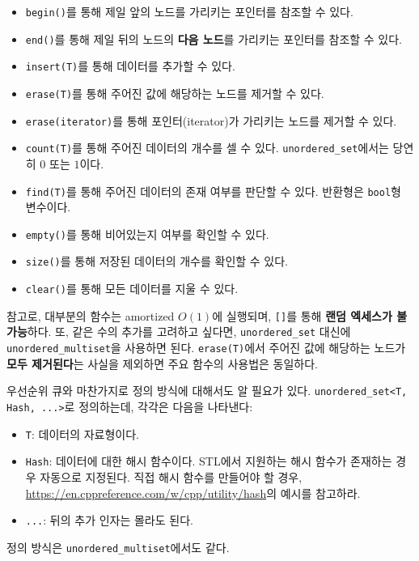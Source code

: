 \begin{itemize}
    \item \texttt{begin()}를 통해 제일 앞의 노드를 가리키는 포인터를 참조할 수 있다.
    \item \texttt{end()}를 통해 제일 뒤의 노드의 \textbf{다음 노드}를 가리키는 포인터를 참조할 수 있다.
    \item \texttt{insert(T)}를 통해 데이터를 추가할 수 있다.
    \item \texttt{erase(T)}를 통해 주어진 값에 해당하는 노드를 제거할 수 있다.
    \item \texttt{erase(iterator)}를 통해 포인터(iterator)가 가리키는 노드를 제거할 수 있다.
    \item \texttt{count(T)}를 통해 주어진 데이터의 개수를 셀 수 있다. \texttt{unordered\_set}에서는 당연히 $0$ 또는 $1$이다.
    \item \texttt{find(T)}를 통해 주어진 데이터의 존재 여부를 판단할 수 있다. 반환형은 \texttt{bool}형 변수이다.
    \item \texttt{empty()}를 통해 비어있는지 여부를 확인할 수 있다.
    \item \texttt{size()}를 통해 저장된 데이터의 개수를 확인할 수 있다.
    \item \texttt{clear()}를 통해 모든 데이터를 지울 수 있다.
\end{itemize}

참고로, 대부분의 함수는 amortized $O(1)$에 실행되며, \texttt{[]}를 통해 \textbf{랜덤 엑세스가 불가능}하다. 또, 같은 수의 추가를 고려하고 싶다면, \texttt{unordered\_set} 대신에 \texttt{unordered\_multiset}을 사용하면 된다. \texttt{erase(T)}에서 주어진 값에 해당하는 노드가 \textbf{모두 제거된다}는 사실을 제외하면 주요 함수의 사용법은 동일하다.

우선순위 큐와 마찬가지로 정의 방식에 대해서도 알 필요가 있다. \texttt{unordered\_set<T, Hash, ...>}로 정의하는데, 각각은 다음을 나타낸다:

\begin{itemize}
    \item \texttt{T}: 데이터의 자료형이다.
    \item \texttt{Hash}: 데이터에 대한 해시 함수이다. STL에서 지원하는 해시 함수가 존재하는 경우 자동으로 지정된다. 직접 해시 함수를 만들어야 할 경우, \url{https://en.cppreference.com/w/cpp/utility/hash}의 예시를 참고하라.
    \item \texttt{...}: 뒤의 추가 인자는 몰라도 된다.
\end{itemize}

정의 방식은 \texttt{unordered\_multiset}에서도 같다.

